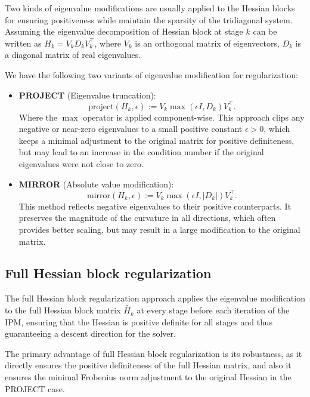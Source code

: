 \documentclass[conference]{IEEEtran}
\begin{document}
Two kinds of eigenvalue modifications are usually applied to the Hessian blocks for ensuring positiveness while maintain the sparsity of the tridiagonal system.
Assuming the eigenvalue decomposition of Hessian block at stage $k$ can be written as $H_k = V_k D_k V_k^\top$,
where $V_k$ is an orthogonal matrix of eigenvectors, $D_k$ is a diagonal matrix of real eigenvalues.

We have the following two variants of eigenvalue modification for regularization\cite{verschueren2017sparsity}:
\begin{itemize}
    \item \textbf{PROJECT} (Eigenvalue truncation):
    \begin{equation*}
        \mathrm{project}(H_k, \epsilon) := V_k \max(\epsilon I, D_k) V_k^\top.
    \end{equation*}
    Where the $\max$ operator is applied component-wise. This approach clips any negative or near-zero eigenvalues to a small positive constant $\epsilon > 0$,
    which keeps a minimal adjustment to the original matrix for positive definiteness, but may lead to an increase in the condition number if the original eigenvalues were not close to zero.

    \item \textbf{MIRROR} (Absolute value modification):
    \begin{equation*}
        \mathrm{mirror}(H_k, \epsilon) := V_k \max(\epsilon I, |D_k|) V_k^\top.
    \end{equation*}
    This method reflects negative eigenvalues to their positive counterparts. 
    It preserves the magnitude of the curvature in all directions, which often provides better scaling,
    but may result in a large modification to the original matrix.
\end{itemize}


\subsection{Full Hessian block regularization}

The full Hessian block regularization approach applies the eigenvalue modification to the full Hessian block matrix $\tilde{H_k}$ at every stage before each iteration of the IPM, 
ensuring that the Hessian is positive definite for all stages and thus guaranteeing a descent direction for the solver.

The primary advantage of full Hessian block regularization is its robustness, as it directly ensures the positive definiteness of the full Hessian matrix,
and also it ensures the minimal Frobenius norm adjustment to the original Hessian in the PROJECT case\cite{nocedal2006numerical}.
\end{document}
